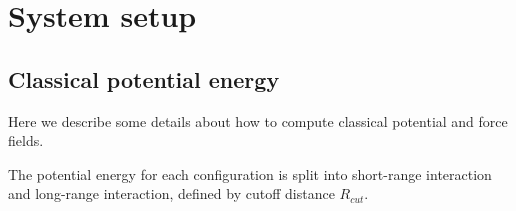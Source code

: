 \documentclass[11pt,letter,nocenter]{revtex4-1}
\begin{document}


%






\section{System setup} 

\subsection{Classical potential energy}
Here we describe some details  about how to compute classical potential and force fields. 

The potential energy for each configuration is split into short-range interaction and long-range interaction, defined by cutoff distance $R_{cut}$. 
\end{document}
